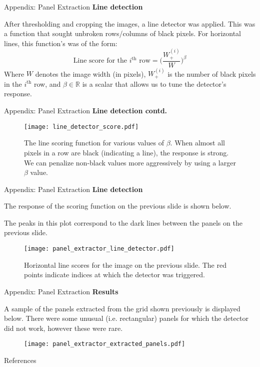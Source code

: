 \documentclass[10pt]{beamer}
\begin{document}
\begin{frame}{Appendix: Panel Extraction}
	\textbf{Line detection}

	After thresholding and cropping the images, a line detector was applied. This was a function that sought unbroken rows/columns of black pixels. For horizontal lines, this function's was of the form:
	\[
		\text{Line score for the $i^{\text{th}}$ row} = \Big(\frac{W^{(i)}_{+}}{W}\Big)^\beta
	\]
	Where $W$ denotes the image width (in pixels),  $W^{(i)}_{+}$ is the number of black pixels in the $i^{\text{th}}$ row, and $\beta \in \mathbb{R}$ is a scalar that allows us to tune the detector's response. 
\end{frame}

\begin{frame}{Appendix: Panel Extraction}
\textbf{Line detection contd.}

	\begin{figure}
	\texttt{[image: line\_detector\_score.pdf]}
	\caption{The line scoring function for various values of $\beta$.  When almost all pixels in a row are black (indicating a line), the response is strong. We can penalize non-black values more aggressively by using a larger $\beta$ value.}
	\end{figure}
\end{frame}


\begin{frame}{Appendix: Panel Extraction}
	\textbf{Line detection}
	
	The response of the scoring function on the previous slide is shown below.

	 The peaks in this plot correspond to the dark lines between the panels on the previous slide.
	\begin{figure}[b]
		\texttt{[image: panel\_extractor\_line\_detector.pdf]}
		\caption{Horizontal line scores for the image on the previous slide. The red points indicate indices at which the detector was triggered.}
	\end{figure}
\end{frame}

\begin{frame}{Appendix: Panel Extraction}
	\textbf{Results}
	
	A sample of the panels extracted from the grid shown previously is displayed below. There were some unusual (i.e. rectangular) panels for which the detector did not work, however these were rare.

	\begin{figure}[b]
		\texttt{[image: panel\_extractor\_extracted\_panels.pdf]}
	\end{figure}
\end{frame}




\begin{frame}[allowframebreaks]{References}

  
  

\end{frame}
\end{document}
